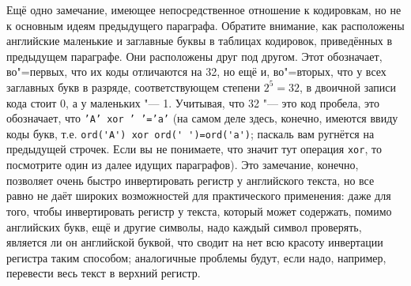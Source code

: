 Ещё одно замечание, имеющее непосредственное отношение к кодировкам, но не к основным идеям 
предыдущего параграфа. Обратите внимание, как расположены английские маленькие и заглавные буквы в 
таблицах кодировок, приведённых в предыдущем параграфе. Они расположены друг под другом. Этот 
обозначает, во"=первых, что их коды отличаются на 32, но ещё и, во"=вторых, что у всех заглавных 
букв в разряде, соответствующем степени $2^5=32$, в двоичной записи кода стоит 0, а у маленьких "--- 1. Учитывая,
что 32 "--- это код пробела, это обозначает, что \texttt{'A' xor ' '='a'} (на самом деле здесь, 
конечно, имеются ввиду коды букв, т.е. \verb|ord('A') xor ord(' ')=ord('a')|; паскаль вам ругнётся 
на предыдущей строчек. Если вы не понимаете, что значит тут операция \verb|xor|, то посмотрите один 
из далее идущих параграфов). Это замечание, конечно, позволяет очень быстро инвертировать регистр у 
английского текста, но все равно не даёт широких возможностей для практического применения: даже 
для того, чтобы инвертировать регистр у текста, который может содержать, помимо английских букв, 
ещё и другие символы, надо каждый символ проверять, является ли он английской буквой, что сводит на 
нет всю красоту инвертации регистра таким способом; аналогичные проблемы будут, если надо, 
например, перевести весь текст в верхний регистр.

